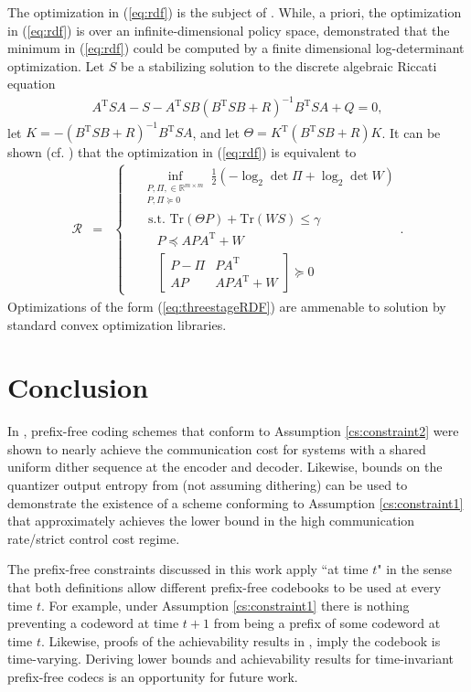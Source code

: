\documentclass[letterpaper, 10 pt, conference]{ieeeconf}  %
\newcounter{constraint}[section]
\begin{document}
The optimization in (\ref{eq:rdf}) is the subject of \cite{SDP_DI}. While, a priori, the optimization in (\ref{eq:rdf}) is over an infinite-dimensional policy space, \cite{SDP_DI} demonstrated that the minimum in (\ref{eq:rdf}) could be computed by a finite dimensional log-determinant optimization. Let $S$ be a stabilizing solution to the discrete algebraic Riccati equation
\begin{align}
    A^{\mathrm{T}}SA-S-A^{\mathrm{T}}SB(B^{\mathrm{T}}SB+R)^{-1}B^{\mathrm{T}}SA+Q = 0,\nonumber
\end{align} let $K=-(B^{\mathrm{T}}SB+R)^{-1}B^{\mathrm{T}}SA$, and let $\Theta = K^{\mathrm{T}}(B^{\mathrm{T}}SB+R)K$. It can be shown (cf. \cite[Section IV.B]{SDP_DI}) that the optimization in (\ref{eq:rdf}) is equivalent to
\begin{align}\label{eq:threestageRDF}
    \mathcal{R} &=& \left\{\begin{aligned}
& \underset{\substack{P,\Pi, \in\mathbb{R}^{m\times m}\\P,\Pi\succeq 0} }{\inf} \frac{1}{2}(-\log_2{\det{\Pi}}+\log_2{\det{W}} )\\ &\text{ }\text{s.t. }  \mathrm{Tr}(\Theta P)+\mathrm{Tr}(WS)\le \gamma \\ &\text{ }\text{ } P\preceq APA^\mathrm{T}+W\\&\text{ }\text{ }\begin{bmatrix}P-\Pi & PA^{\mathrm{T}} \\ AP & APA^{\mathrm{T}}+W \end{bmatrix}\succeq 0 
\end{aligned}.\right.
\end{align} Optimizations of the form (\ref{eq:threestageRDF}) are ammenable to solution by standard convex optimization libraries. 
\section{Conclusion}
In \cite{silvaFirst}, \cite{tanakaISIT} prefix-free coding schemes that conform to Assumption \ref{cs:constraint2} were shown to nearly achieve the communication cost for systems with a shared uniform dither sequence at the encoder and decoder. Likewise, bounds on the quantizer output entropy from \cite{kostinaTradeoff} (not assuming dithering) can be used to demonstrate the existence of a scheme conforming to Assumption \ref{cs:constraint1} that approximately achieves the lower bound in the high communication rate/strict control cost regime. 

The prefix-free constraints discussed in this work apply ``at time $t$" in the sense that both  definitions allow different prefix-free codebooks to be used at every time $t$. For example, under Assumption \ref{cs:constraint1} there is nothing preventing a codeword at time $t+1$ from being a prefix of some codeword at time $t$. Likewise, proofs of the achievability results in \cite{tanakaISIT}, \cite{kostinaTradeoff} imply the codebook is time-varying. Deriving lower bounds and achievability results for time-invariant prefix-free codecs is an opportunity for future work. 



\end{document}

